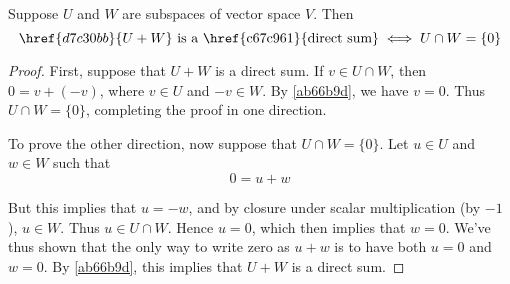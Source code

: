 \label{f41081f}

Suppose $U$ and $W$ are subspaces of vector space $V$. Then
$$
  \href{d7c30bb}{U+W}\text{ is a \href{c67c961}{direct sum}}\iff U\cap W=\{0\}
$$

\begin{proof}
  First, suppose that $U+W$ is a direct sum. If $v\in U\cap W$, then $0=v+(-v)$,
  where $v\in U$ and $-v\in W$. By \autoref{ab66b9d}, we have $v=0$. Thus $U\cap
  W=\{0\}$, completing the proof in one direction.

  To prove the other direction, now suppose that $U\cap W=\{0\}$. Let $u\in U$
  and $w\in W$ such that
  $$
    0=u+w
  $$

  But this implies that $u=-w$, and by closure under scalar multiplication (by
  $-1$), $u\in W$. Thus $u\in U\cap W$. Hence $u=0$, which then implies that
  $w=0$. We've thus shown that the only way to write zero as $u+w$ is to have
  both $u=0$ and $w=0$. By \autoref{ab66b9d}, this implies that $U+W$ is a
  direct sum.
\end{proof}
